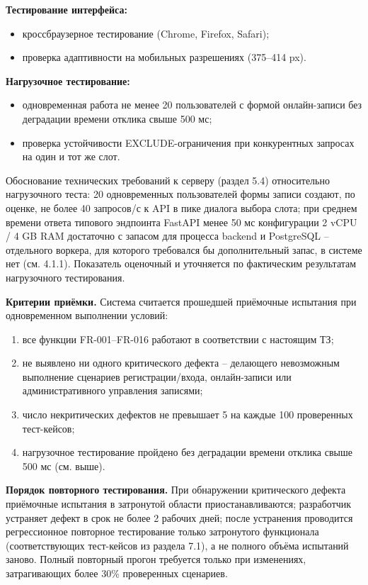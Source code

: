 \textbf{Тестирование интерфейса:}
\begin{itemize}
  \item кроссбраузерное тестирование (Chrome, Firefox, Safari);
  \item проверка адаптивности на мобильных разрешениях (375--414 px).
\end{itemize}

\textbf{Нагрузочное тестирование:}
\begin{itemize}
  \item одновременная работа не менее 20 пользователей с формой онлайн-записи без деградации времени отклика свыше 500 мс;
  \item проверка устойчивости EXCLUDE-ограничения при конкурентных запросах на один и тот же слот.
\end{itemize}

Обоснование технических требований к серверу (раздел 5.4) относительно нагрузочного теста: 20 одновременных пользователей формы записи создают, по оценке, не более 40 запросов/с к API в пике диалога выбора слота; при среднем времени ответа типового эндпоинта FastAPI менее 50 мс конфигурации 2 vCPU / 4 GB RAM достаточно с запасом для процесса backend и PostgreSQL -- отдельного воркера, для которого требовался бы дополнительный запас, в системе нет (см. 4.1.1). Показатель оценочный и уточняется по фактическим результатам нагрузочного тестирования.

\textbf{Критерии приёмки.} Система считается прошедшей приёмочные испытания при одновременном выполнении условий:
\begin{enumerate}
  \item все функции FR-001--FR-016 работают в соответствии с настоящим ТЗ;
  \item не выявлено ни одного критического дефекта -- делающего невозможным выполнение сценариев регистрации/входа, онлайн-записи или административного управления записями;
  \item число некритических дефектов не превышает 5 на каждые 100 проверенных тест-кейсов;
  \item нагрузочное тестирование пройдено без деградации времени отклика свыше 500 мс (см. выше).
\end{enumerate}

\textbf{Порядок повторного тестирования.} При обнаружении критического дефекта приёмочные испытания в затронутой области приостанавливаются; разработчик устраняет дефект в срок не более 2 рабочих дней; после устранения проводится регрессионное повторное тестирование только затронутого функционала (соответствующих тест-кейсов из раздела 7.1), а не полного объёма испытаний заново. Полный повторный прогон требуется только при изменениях, затрагивающих более 30\% проверенных сценариев.

